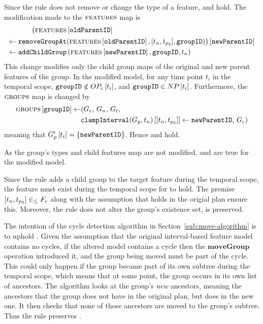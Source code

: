 Since the  rule does not remove or change the type of a feature,  and  hold. The modification made to the $\textsc{features}{}$ map is 
\begin{align*}
   \lookup{\big(\lookup{\features{}&}{\var{oldParentID}} \\
   \assign  \var{removeGroupAt}& (\lookup{\features{}}{\var{oldParentID}}, \interval{t_n}{t_{p_2}}, \var{groupID})\big)}{\var{newParentID}} \\
   \assign  \var{addChildGroup}& \left(\lookup{\features{}}{\var{newParentID}}, \var{groupID}, t_n\right)
\end{align*}
This change modifies only the child group maps of the original and new parent features of the group. In the modified model, for any time point $t_i$ in the temporal scope, $\texttt{groupID} \notin OP_c \left[ t_i \right]$, and $\texttt{groupID} \in NP \left[ t_i \right]$. Furthermore, the $\textsc{groups}{}{}$ map is changed by
\begin{align*}
   \lookup{\groups{}}{\var{groupID}} \assign &(G_e,\, G_n,\, G_t,\, \\
                                             & \lookup{\var{clampInterval}(G_p, t_n)}{\interval{t_n}{t_{p_2}}} \assign \var{newParentID},\, G_c)
\end{align*}
meaning that $G'_p \left[ t_i \right] = \left\{\texttt{newParentID}\right\}$. Hence  and  hold. 

As the group's types and child features map are not modified,  and  are true for the modified model.  

Since the rule adds a child group to the target feature during the temporal scope, the feature must exist during the temporal scope for  to hold. The premise $\interval{t_n}{t_{p_2}} \inn F_e$ along with the assumption that  holds in the origial plan ensure this. Moreover, the rule does not alter the group's existence set,  is preserved. 

The intention of the cycle detection algorithm in Section~\vref{sub:move-algorithm} is to uphold . Given the assumption that the original interval-based feature model contains no cycles, if the altered model contains a cycle then the $\textbf{moveGroup}$ operation introduced it, and the group being moved must be part of the cycle. This could only happen if the group became part of its own subtree during the temporal scope, which means that at some point, the group occurs in its own list of ancestors. The algorithm looks at the group's \emph{new} ancestors, meaning the ancestors that the group does not have in the original plan, but does in the new one. It then checks that none of those ancestors are moved to the group's subtree. Thus the rule preserves .

